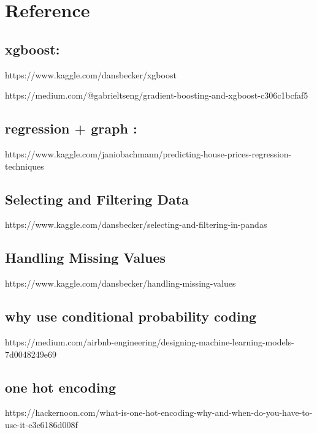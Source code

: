 \documentclass[11pt, a4paper , landscape]{article}
\begin{document}
    \section{Reference}\label{reference}

\subsection{xgboost:}\label{xgboost}

https://www.kaggle.com/dansbecker/xgboost

https://medium.com/@gabrieltseng/gradient-boosting-and-xgboost-c306c1bcfaf5

\subsection{regression + graph :}\label{regression-graph}

https://www.kaggle.com/janiobachmann/predicting-house-prices-regression-techniques

\subsection{Selecting and Filtering
Data}\label{selecting-and-filtering-data}

https://www.kaggle.com/dansbecker/selecting-and-filtering-in-pandas

\subsection{Handling Missing Values}\label{handling-missing-values}

https://www.kaggle.com/dansbecker/handling-missing-values

\subsection{why use conditional probability
coding}\label{why-use-conditional-probability-coding}

https://medium.com/airbnb-engineering/designing-machine-learning-models-7d0048249e69

\subsection{one hot encoding}\label{one-hot-encoding}

https://hackernoon.com/what-is-one-hot-encoding-why-and-when-do-you-have-to-use-it-e3c6186d008f
\end{document}
